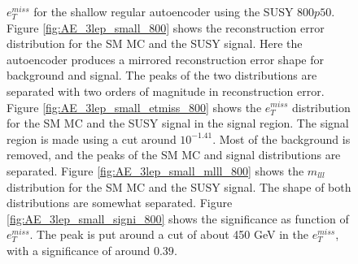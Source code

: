 \begin{figure}[H]
{    $e_T^{miss}$ for the shallow regular autoencoder using the SUSY $800p50$. 
    Figure \ref{fig:AE_3lep_small_800} shows the reconstruction error 
    distribution for the SM MC and the SUSY signal. Here the autoencoder produces a mirrored reconstruction error shape for background and 
    signal. The peaks of the two distributions are separated with two orders of magnitude in reconstruction error. Figure \ref{fig:AE_3lep_small_etmiss_800} 
    shows the $e_T^{miss}$ distribution for the SM MC and the SUSY signal in the signal region. 
    The signal region is made using a cut around $10^{-1.41}$. Most of the background is removed, and the peaks of the SM MC and signal 
    distributions are separated. Figure \ref{fig:AE_3lep_small_mlll_800} shows the $m_{lll}$ distribution for the SM MC and the SUSY signal. 
    The shape of both distributions are somewhat separated. Figure \ref{fig:AE_3lep_small_signi_800} shows the significance as function of
    $e_T^{miss}$. The peak is put around a cut of about 450 GeV in the $e_T^{miss}$, with a significance of around $0.39$.}
    \label{fig:AE_3lep_small_rec_sig_signi_800}
\end{figure}

